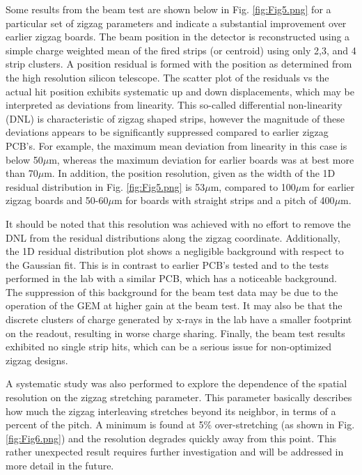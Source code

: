 \begin{enumerate}
Some results from the beam test are shown below in Fig. \ref{fig:Fig5.png} for a particular set of zigzag parameters and indicate a substantial improvement over earlier zigzag boards. The beam position in the detector is reconstructed using a simple charge weighted mean of the fired strips (or centroid) using only 2,3, and 4 strip clusters. A position residual is formed with the position as determined from the high resolution silicon telescope. The scatter plot of the residuals vs the actual hit position exhibits systematic up and down displacements, which may be interpreted as deviations from linearity. This so-called differential non-linearity (DNL) is characteristic of zigzag shaped strips, however the magnitude of these deviations appears to be significantly suppressed compared to earlier zigzag PCB’s. For example, the maximum mean deviation from linearity in this case is below 50$\mu$m, whereas the maximum deviation for earlier boards was at best more than 70$\mu$m. In addition, the position resolution, given as the width of the 1D residual distribution in Fig. \ref{fig:Fig5.png} is 53$\mu$m, compared to 100$\mu$m for earlier zigzag boards and 50-60$\mu$m for boards with straight strips and a pitch of 400$\mu$m. 

It should be noted that this resolution was achieved with no effort to remove the DNL from the residual distributions along the zigzag coordinate. Additionally, the 1D residual distribution plot shows a negligible background with respect to the Gaussian fit. This is in contrast to earlier PCB’s tested and to the tests performed in the lab with a similar PCB, which has a noticeable background. The suppression of this background for the beam test data may be due to the operation of the GEM at higher gain at the beam test. It may also be that the discrete clusters of charge generated by x-rays in the lab have a smaller footprint on the readout, resulting in worse charge sharing. Finally, the beam test results exhibited no single strip hits, which can be a serious issue for non-optimized zigzag designs.
   
A systematic study was also performed to explore the dependence of the spatial resolution on the zigzag stretching parameter. This parameter basically describes how much the zigzag interleaving stretches beyond its neighbor, in terms of a percent of the pitch. A minimum is found at 5\% over-stretching (as shown in Fig. \ref{fig:Fig6.png}) and the resolution degrades quickly away from this point. This rather unexpected result requires further investigation and will be addressed in more detail in the future.


\end{enumerate}
